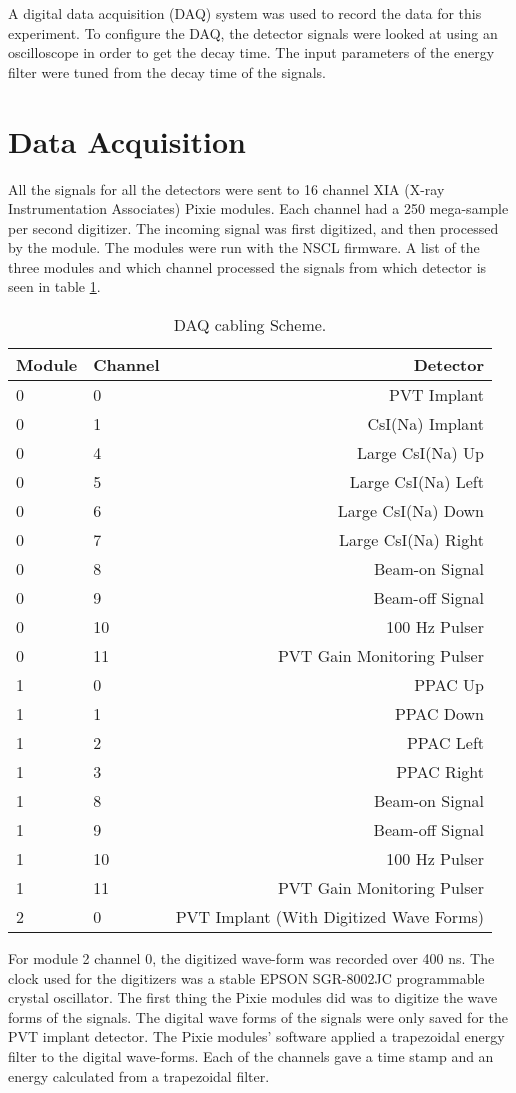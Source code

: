 \documentclass[../MaxHughesThesis.tex]{subfiles}
\begin{document}
A digital data acquisition (DAQ) system was used to record the data for this experiment.
To configure the DAQ, the detector signals were looked at using an oscilloscope in order to get the decay time.
The input parameters of the energy filter were tuned from the decay time of the signals.

\section{Data Acquisition}

All the signals for all the detectors were sent to 16 channel XIA (X-ray Instrumentation Associates) Pixie modules. 
Each channel had a 250 mega-sample per second digitizer. 
The incoming signal was first digitized, and then processed by the module. 
The modules were run with the NSCL firmware.
A list of the three modules and which channel processed the signals from which detector is seen in table \ref{tab:cablingscheme}.
%
\begin{table}[!hbt]
	\centering
	\caption{DAQ cabling Scheme.}
		\begin{tabular}{llr} \hline \hline 
		Module & Channel & Detector \\ \hline
		0 & 0 & PVT Implant \\
		0 & 1 & CsI(Na) Implant \\
		0 & 4 & Large CsI(Na) Up \\
		0 & 5 & Large CsI(Na) Left \\
		0 & 6 & Large CsI(Na) Down \\
		0 & 7 & Large CsI(Na) Right \\
		0 & 8 & Beam-on Signal \\
		0 & 9 & Beam-off Signal \\
		0 & 10 & 100 Hz Pulser \\
		0 & 11 & PVT Gain Monitoring Pulser \\
		1 & 0 & PPAC Up \\ 
		1 & 1 & PPAC Down \\ 
		1 & 2 & PPAC Left \\ 
		1 & 3 & PPAC Right \\ 
		1 & 8 & Beam-on Signal\\
		1 & 9 & Beam-off Signal\\
		1 & 10 & 100 Hz Pulser \\
		1 & 11 & PVT Gain Monitoring Pulser \\
		2 & 0 & PVT Implant (With Digitized Wave Forms) \\ \hline \hline
		\end{tabular}	
		\label{tab:cablingscheme}
\end{table}
%
For module 2 channel 0, the digitized wave-form was recorded over 400 ns.
The clock used for the digitizers was a stable EPSON SGR-8002JC programmable crystal oscillator.
The first thing the Pixie modules did was to digitize the wave forms of the signals.
The digital wave forms of the signals were only saved for the PVT implant detector.
The Pixie modules' software applied a trapezoidal energy filter to the digital wave-forms.
Each of the channels gave a time stamp and an energy calculated from a trapezoidal filter.
\end{document}
